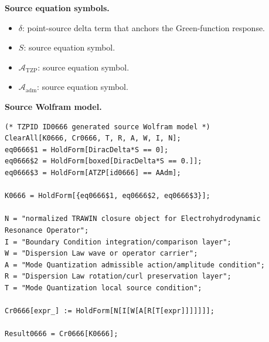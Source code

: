 \begin{minipage}[t]{0.49\linewidth}
\begingroup
\small
\raggedright
\textbf{Source equation symbols.}\par
\begin{itemize}[leftmargin=1.35em,itemsep=1pt,topsep=1pt,parsep=0pt]
    \item $\delta$: point-source delta term that anchors the Green-function response.
    \item $S$: source equation symbol.
    \item $\mathcal{A}_{\mathrm{TZP}}$: source equation symbol.
    \item $\mathcal{A}_{\mathrm{adm}}$: source equation symbol.
\end{itemize}
\endgroup
\end{minipage}\hfill
\begin{minipage}[t]{0.47\linewidth}
\begingroup
\scriptsize
\raggedright
\textbf{Source Wolfram model.}\par
\begin{Verbatim}[fontsize=\tiny,breaklines=true,breakanywhere=true]
(* TZPID ID0666 generated source Wolfram model *)
ClearAll[K0666, Cr0666, T, R, A, W, I, N];
eq0666$1 = HoldForm[DiracDelta*S == 0];
eq0666$2 = HoldForm[boxed[DiracDelta*S == 0.]];
eq0666$3 = HoldForm[ATZP[id0666] == AAdm];

K0666 = HoldForm[{eq0666$1, eq0666$2, eq0666$3}];

N = "normalized TRAWIN closure object for Electrohydrodynamic Resonance Operator";
I = "Boundary Condition integration/comparison layer";
W = "Dispersion Law wave or operator carrier";
A = "Mode Quantization admissible action/amplitude condition";
R = "Dispersion Law rotation/curl preservation layer";
T = "Mode Quantization local source condition";

Cr0666[expr_] := HoldForm[N[I[W[A[R[T[expr]]]]]]];

Result0666 = Cr0666[K0666];
\end{Verbatim}
\endgroup
\end{minipage}

